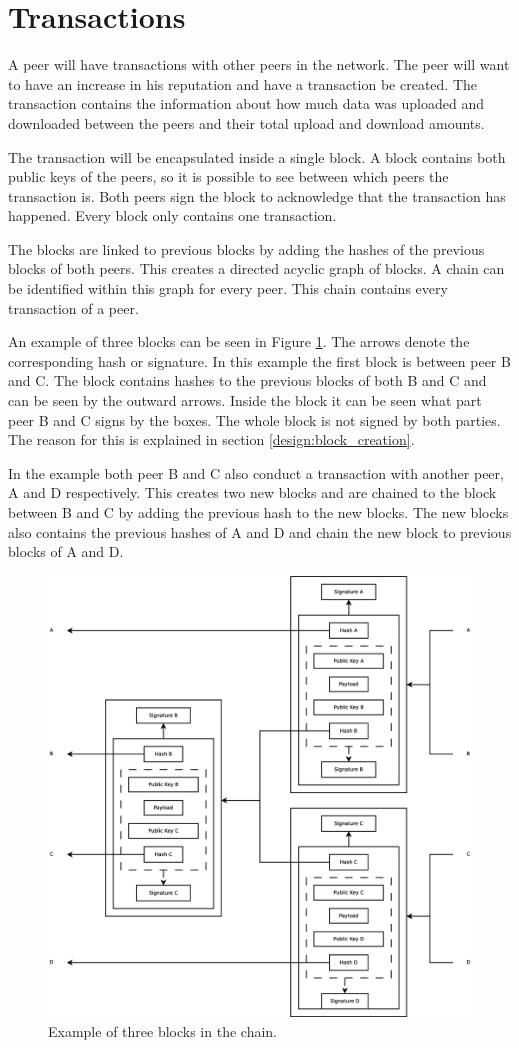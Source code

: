 \section{Transactions}
A peer will have transactions with other peers in the network.
The peer will want to have an increase in his reputation and have a transaction be created.
The transaction contains the information about how much data was uploaded and downloaded between the peers
and their total upload and download amounts.

The transaction will be encapsulated inside a single block.
A block contains both public keys of the peers,
so it is possible to see between which peers the transaction is.
Both peers sign the block to acknowledge that the transaction has happened.
Every block only contains one transaction.

The blocks are linked to previous blocks by adding the hashes of the previous blocks of both peers.
This creates a directed acyclic graph of blocks.
A chain can be identified within this graph for every peer.
This chain contains every transaction of a peer.

An example of three blocks can be seen in Figure \ref{fig:chain-example}.
The arrows denote the corresponding hash or signature.
In this example the first block is between peer B and C.
The block contains hashes to the previous blocks of both B and C
and can be seen by the outward arrows.
Inside the block it can be seen what part peer B and C signs by the boxes.
The whole block is not signed by both parties.
The reason for this is explained in section \ref{design:block_creation}.

In the example both peer B and C also conduct a transaction with another peer, A and D respectively.
This creates two new blocks and are chained to the block between B and C by adding the previous hash to the new blocks.
The new blocks also contains the previous hashes of A and D
and chain the new block to previous blocks of A and D.

\begin{figure}
	\centerline{\includegraphics[scale=0.3]{design/figs/chain.eps}}
	\caption{Example of three blocks in the chain.}
	\label{fig:chain-example}
\end{figure}